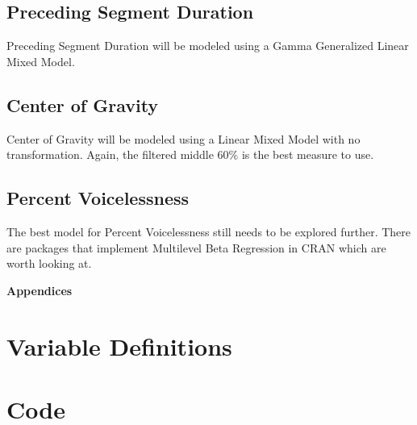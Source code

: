 \documentclass[a4paper]{article}
\begin{document}
\subsection*{Preceding Segment Duration}
Preceding Segment Duration will be modeled using a Gamma Generalized Linear
Mixed Model.

\subsection*{Center of Gravity}
Center of Gravity will be modeled using a Linear Mixed Model with no
transformation.  Again, the filtered middle 60\% is the best measure
to use.

\subsection*{Percent Voicelessness}
The best model for Percent Voicelessness still needs to be explored
further.  There are packages that implement Multilevel Beta Regression
in CRAN which are worth looking at.


\newpage
\begin{center} {\bf\huge Appendices} \end{center}
\renewcommand{\thesection}{A.\arabic{section}}
\setcounter{section}{0}
\setcounter{page}{1}
\section{ Variable Definitions}
\label{a:vardef}

\newpage
\section{ Code}
\renewcommand{\thesubsection}{\thesection.\alph{subsection}}
\end{document}
